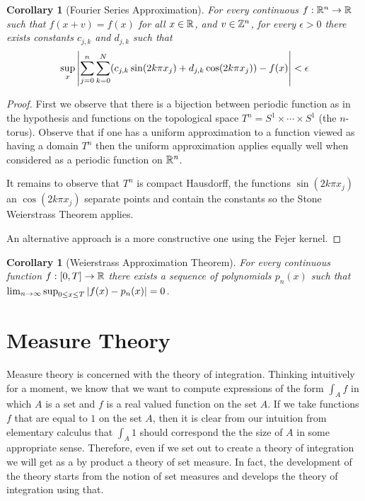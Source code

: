 \documentclass{amsart}
\newtheorem{cor}[thm]{Corollary}
\theoremstyle{remark}
\theoremstyle{definition}
\begin{document}
\begin{cor}[Fourier Series Approximation]\label{FourierSeries}For
  every continuous $f : \mathbb{R}^n \to \mathbb{R}$ such that $f(x + v) =
  f(x)$ for all $x \in \mathbb{R}$, and $v \in \mathbb{Z}^n$, for every
$\epsilon > 0$  there exists constants $c_{j,k}$ and
$d_{j,k}$ such that 
\begin{align*}
\sup_x \left \vert \sum_{j=0}^n \sum_{k=0}^N (c_{j,k} \sin(2k\pi x_j) + d_{j,k}
\cos(2k\pi x_j)) - f(x) \right \vert < \epsilon
\end{align*}
\end{cor}
\begin{proof}First we observe that there is a bijection between
  periodic function as in the hypothesis and functions on the
  topological space $T^n = S^1 \times \cdots \times S^1$ (the $n$-torus).
Observe that if one has a uniform approximation to a function
viewed as having a domain $T^n$ then the uniform approximation applies
equally well when considered as a periodic function on $\mathbb{R}^n$.

It remains to observe that $T^n$ is compact Hausdorff, the functions $\sin(2k\pi x_j)$ an $\cos(2k
\pi x_j)$ separate points and contain the constants so the Stone Weierstrass
Theorem applies.

An alternative approach is a more constructive one using the Fejer kernel.
\end{proof}

\begin{cor}[Weierstrass Approximation
  Theorem]\label{WeierstrassApproximation}For every continuous
  function $f : [0,T] \to \mathbb{R}$ there exists a sequence of
  polynomials $p_n(x)$ such that $\lim_{n \to \infty} \sup_{0 \leq x \leq T} \left \vert f(x) -
    p_n(x) \right \vert = 0$.
\end{cor}

\section{Measure Theory}
Measure theory is concerned with the theory of integration.  Thinking
intuitively for a moment, we know that we want to compute
expressions of the form $\int_A f$ in which $A$ is a set and $f$ is a
real valued function on the set $A$.  If we take functions $f$ that
are equal to $1$ on the set $A$, then it is clear from our intuition
from elementary calculus that $\int_A 1$ should correspond the the
size of $A$ in some appropriate sense.  Therefore, even if we set out
to create a theory of integration we will get as a by product a theory
of set measure.  In fact, the development of the theory starts from
the notion of set measures and develops the theory of integration
using that.
\end{document}
